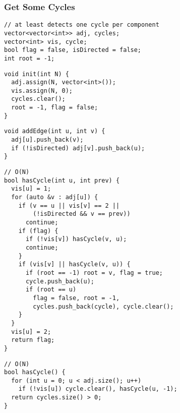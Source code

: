 \documentclass[twoside]{article}
\begin{document}
\begin{multicols*}{2}
\subsubsection*{Get Some Cycles}
\begin{verbatim}
// at least detects one cycle per component
vector<vector<int>> adj, cycles;
vector<int> vis, cycle;
bool flag = false, isDirected = false;
int root = -1;
\end{verbatim}
\vspace{-12pt}
\begin{verbatim}
void init(int N) {
  adj.assign(N, vector<int>());
  vis.assign(N, 0);
  cycles.clear();
  root = -1, flag = false;
}
\end{verbatim}
\vspace{-12pt}
\begin{verbatim}
void addEdge(int u, int v) {
  adj[u].push_back(v);
  if (!isDirected) adj[v].push_back(u);
}
\end{verbatim}
\vspace{-12pt}
\begin{verbatim}
// O(N)
bool hasCycle(int u, int prev) {
  vis[u] = 1;
  for (auto &v : adj[u]) {
    if (v == u || vis[v] == 2 ||
        (!isDirected && v == prev))
      continue;
    if (flag) {
      if (!vis[v]) hasCycle(v, u);
      continue;
    }
    if (vis[v] || hasCycle(v, u)) {
      if (root == -1) root = v, flag = true;
      cycle.push_back(u);
      if (root == u)
        flag = false, root = -1,
        cycles.push_back(cycle), cycle.clear();
    }
  }
  vis[u] = 2;
  return flag;
}
\end{verbatim}
\vspace{-12pt}
\begin{verbatim}
// O(N)
bool hasCycle() {
  for (int u = 0; u < adj.size(); u++)
    if (!vis[u]) cycle.clear(), hasCycle(u, -1);
  return cycles.size() > 0;
}
\end{verbatim}

\subsubsectionfont{\large\bfseries\sffamily\underline}

\end{multicols*}
\end{document}
